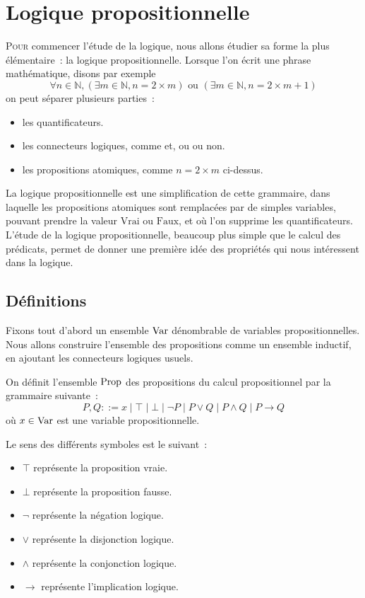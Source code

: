 \chapter{Logique propositionnelle}
\label{chp.logprop}

\minitoc

\lettrine{P}{our} commencer l'étude de la logique, nous allons étudier sa forme
la plus élémentaire~: la logique propositionnelle. Lorsque l'on écrit une phrase
mathématique, disons par exemple
\[\forall n \in \mathbb N, (\exists m \in \mathbb N, n = 2\times m) \text{ ou }
(\exists m \in \mathbb N, n = 2 \times m + 1)\]
on peut séparer plusieurs parties~:
\begin{itemize}
\item les quantificateurs.
\item les connecteurs logiques, comme \og et\fg{}, \og ou\fg{} ou \og non\fg{}.
\item les propositions atomiques, comme $n = 2 \times m$ ci-dessus.
\end{itemize}

La logique propositionnelle est une simplification de cette grammaire, dans
laquelle les propositions atomiques sont remplacées par de simples variables,
pouvant prendre la valeur $\mathrm{Vrai}$ ou $\mathrm{Faux}$, et où l'on
supprime les quantificateurs. L'étude de la logique propositionnelle, beaucoup
plus simple que le calcul des prédicats, permet de donner une première idée des
propriétés qui nous intéressent dans la logique.

\section{Définitions}

Fixons tout d'abord un ensemble $\operatorname{Var}$ dénombrable de variables
propositionnelles. Nous allons construire l'ensemble des propositions comme un
ensemble inductif, en ajoutant les connecteurs logiques usuels.

\begin{definition}[Propositions]
  On définit l'ensemble $\operatorname{Prop}$ des propositions du calcul
  propositionnel par la grammaire suivante~:
  \[P,Q ::= x \mid \top \mid \bot \mid \lnot P \mid P \lor Q \mid P \land Q
  \mid P \to Q\]
  où $x\in \operatorname{Var}$ est une variable propositionnelle.
\end{definition}

Le sens des différents symboles est le suivant~:
\begin{itemize}
\item $\top$ représente la proposition vraie.
\item $\bot$ représente la proposition fausse.
\item $\lnot$ représente la négation logique.
\item $\lor$ représente la disjonction logique.
\item $\land$ représente la conjonction logique.
\item $\to$ représente l'implication logique.
\end{itemize}

